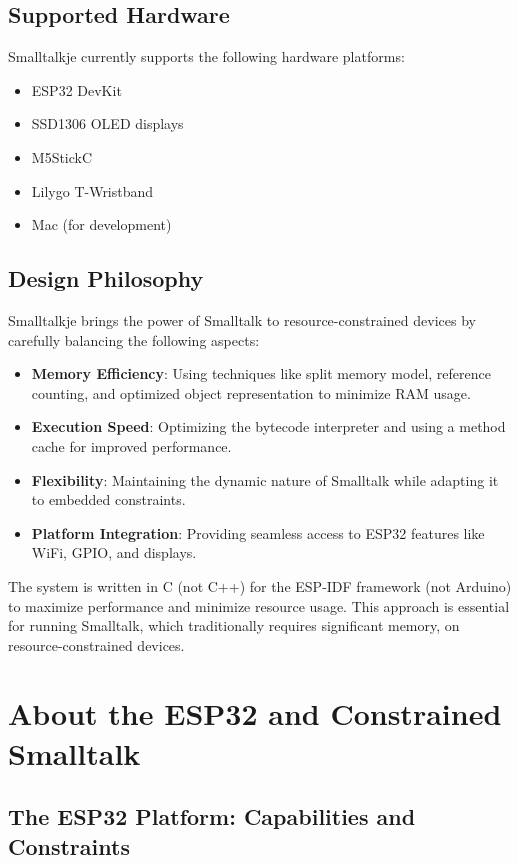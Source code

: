 \documentclass[12pt,a4paper]{report}
\begin{document}
\section{Supported Hardware}
Smalltalkje currently supports the following hardware platforms:
\begin{itemize}
    \item ESP32 DevKit
    \item SSD1306 OLED displays
    \item M5StickC
    \item Lilygo T-Wristband
    \item Mac (for development)
\end{itemize}

\section{Design Philosophy}
Smalltalkje brings the power of Smalltalk to resource-constrained devices by carefully balancing the following aspects:

\begin{itemize}
    \item \textbf{Memory Efficiency}: Using techniques like split memory model, reference counting, and optimized object representation to minimize RAM usage.
    \item \textbf{Execution Speed}: Optimizing the bytecode interpreter and using a method cache for improved performance.
    \item \textbf{Flexibility}: Maintaining the dynamic nature of Smalltalk while adapting it to embedded constraints.
    \item \textbf{Platform Integration}: Providing seamless access to ESP32 features like WiFi, GPIO, and displays.
\end{itemize}

The system is written in C (not C++) for the ESP-IDF framework (not Arduino) to maximize performance and minimize resource usage. This approach is essential for running Smalltalk, which traditionally requires significant memory, on resource-constrained devices.

\chapter{About the ESP32 and Constrained Smalltalk}

\section{The ESP32 Platform: Capabilities and Constraints}
\end{document}
